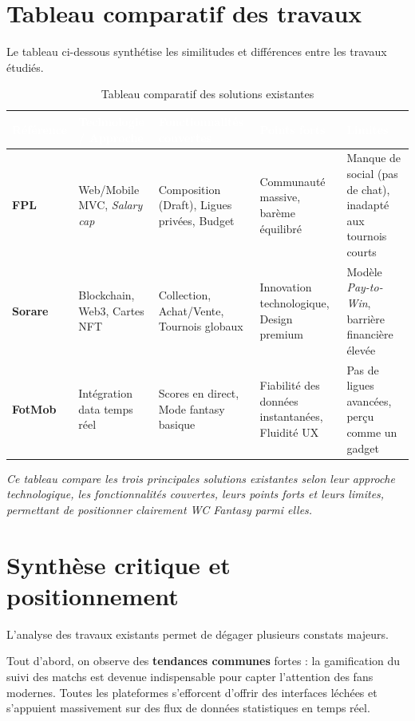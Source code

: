 \section{Tableau comparatif des travaux}
Le tableau ci-dessous synthétise les similitudes et différences entre les travaux étudiés.

\vspace{0.3cm}
\begin{table}[H]
\centering
\begin{tabularx}{\linewidth}{|>{\raggedright\arraybackslash}p{1.8cm}|X|X|X|X|}
\hline
\rowcolor{emsigreen}\textcolor{white}{\textbf{Référence}} & \textcolor{white}{\textbf{Technologie / Approche}} & \textcolor{white}{\textbf{Fonctionnalités couvertes}} & \textcolor{white}{\textbf{Points forts}} & \textcolor{white}{\textbf{Limites}} \\
\hline
\textbf{FPL} & Web/Mobile MVC, \textit{Salary cap} & Composition (Draft), Ligues privées, Budget & Communauté massive, barème équilibré & Manque de social (pas de chat), inadapté aux tournois courts \\
\hline
\textbf{Sorare} & Blockchain, Web3, Cartes NFT & Collection, Achat/Vente, Tournois globaux & Innovation technologique, Design premium & Modèle \textit{Pay-to-Win}, barrière financière élevée \\
\hline
\textbf{FotMob} & Intégration data temps réel & Scores en direct, Mode fantasy basique & Fiabilité des données instantanées, Fluidité UX & Pas de ligues avancées, perçu comme un gadget \\
\hline
\end{tabularx}
\caption{Tableau comparatif des solutions existantes}
\label{tab:comparatif_etat_art}
\end{table}

\vspace{0.2cm}
\noindent\small\textit{Ce tableau compare les trois principales solutions existantes selon leur approche technologique, les fonctionnalités couvertes, leurs points forts et leurs limites, permettant de positionner clairement WC Fantasy parmi elles.}\normalsize

\section{Synthèse critique et positionnement}
L'analyse des travaux existants permet de dégager plusieurs constats majeurs. 

Tout d'abord, on observe des \textbf{tendances communes} fortes : la gamification du suivi des matchs est devenue indispensable pour capter l'attention des fans modernes. Toutes les plateformes s'efforcent d'offrir des interfaces léchées et s'appuient massivement sur des flux de données statistiques en temps réel.

